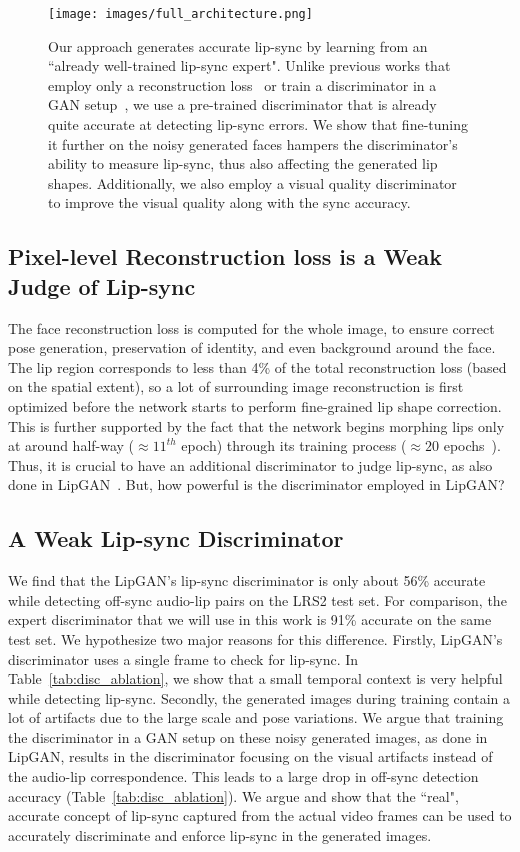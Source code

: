 \documentclass[sigconf]{acmart}
\begin{document}
\begin{figure*}
 \texttt{[image: images/full\_architecture.png]}
 
 \caption{Our approach generates accurate lip-sync by learning from an ``already well-trained lip-sync expert". Unlike previous works that employ only a reconstruction loss~\cite{jamaludin2019you} or train a discriminator in a GAN setup~\cite{kr2019towards}, we use a pre-trained discriminator that is already quite accurate at detecting lip-sync errors. We show that fine-tuning it further on the noisy generated faces hampers the discriminator's ability to measure lip-sync, thus also affecting the generated lip shapes. Additionally, we also employ a visual quality discriminator to improve the visual quality along with the sync accuracy.}
 \label{fig:full_arch}
\end{figure*}
\subsection{Pixel-level Reconstruction loss is a Weak Judge of Lip-sync}
The face reconstruction loss is computed for the whole image, to ensure correct pose generation, preservation of identity, and even background around the face. The lip region corresponds to less than 4\% of the total reconstruction loss (based on the spatial extent), so a lot of surrounding image reconstruction is first optimized before the network starts to perform fine-grained lip shape correction. This is further supported by the fact that the network begins morphing lips only at around half-way ($\approx 11^{th}$ epoch) through its training process ($\approx20$ epochs~\cite{kr2019towards}). Thus, it is crucial to have an additional discriminator to judge lip-sync, as also done in LipGAN~\cite{kr2019towards}. But, how powerful is the discriminator employed in LipGAN?

\subsection{A Weak Lip-sync Discriminator}
\label{section:nodisc}
We find that the LipGAN's lip-sync discriminator is only about 56\% accurate while detecting off-sync audio-lip pairs on the LRS2 test set. For comparison, the expert discriminator that we will use in this work is 91\% accurate on the same test set. We hypothesize two major reasons for this difference. Firstly, LipGAN's discriminator uses a single frame to check for lip-sync. In Table~\ref{tab:disc_ablation}, we show that a small temporal context is very helpful while detecting lip-sync. Secondly, the generated images during training contain a lot of artifacts due to the large scale and pose variations. We argue that training the discriminator in a GAN setup on these noisy generated images, as done in LipGAN, results in the discriminator focusing on the visual artifacts instead of the audio-lip correspondence. This leads to a large drop in off-sync detection accuracy (Table~\ref{tab:disc_ablation}). We argue and show that the ``real", accurate concept of lip-sync captured from the actual video frames can be used to accurately discriminate and enforce lip-sync in the generated images.
\end{document}
